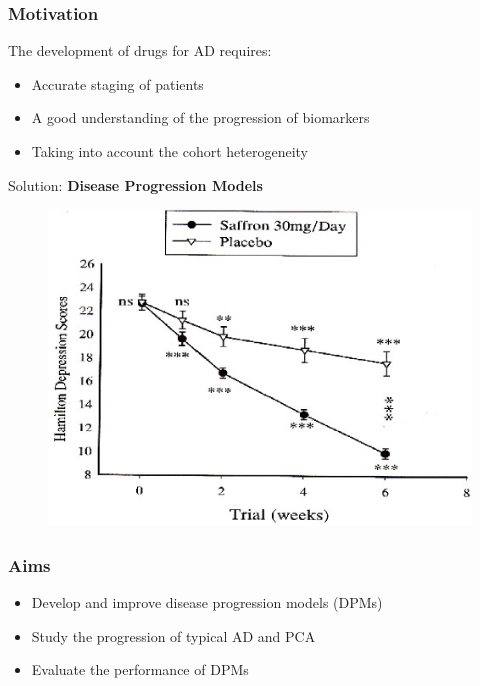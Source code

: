 \documentclass[10pt,xcolor=table]{beamer}
\begin{document}
\begin{frame}
\frametitle{Motivation}

The development of drugs for AD requires:
\begin{itemize}
 \item Accurate staging of patients
 \item A good understanding of the progression of biomarkers
 \item Taking into account the cohort heterogeneity
\end{itemize}

Solution: \textbf{Disease Progression Models}


\begin{figure}
\centering
\includegraphics[scale=1.4]{drug_progression.jpg} 
\end{figure}

\end{frame}


\begin{frame}
\frametitle{Aims}

\begin{itemize}
 \item Develop and improve disease progression models (DPMs)
 \item Study the progression of typical AD and PCA
 \item Evaluate the performance of DPMs
\end{itemize}


\end{frame}
\end{document}

